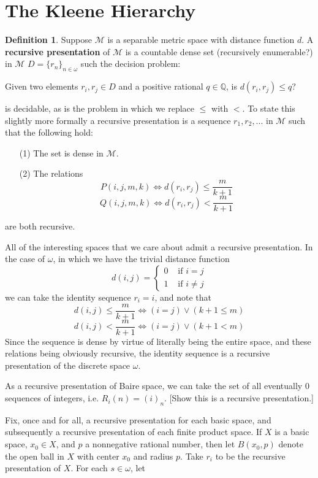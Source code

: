 \documentclass{article}
\theoremstyle{definition}
\newtheorem{definition}{Definition}[section]
\theoremstyle{plain}
\begin{document}
\section{The Kleene Hierarchy}
\begin{definition}
    Suppose $\mathcal{M}$ is a separable metric space with distance function $d$. A \textbf{recursive presentation} of $\mathcal{M}$ is a countable dense set (recursively enumerable?) in $\mathcal{M}$ $D = \{r_n\}_{n \in \omega}$ such the decision problem:
    \begin{center}
        Given two elements $r_i,r_j \in D$ and a positive rational $q \in \mathbb{Q}$, is $d(r_i,r_j) \leq q$?
    \end{center}
    is decidable, as is the problem in which we replace $\leq$ with $<$. To state this slightly more formally a recursive presentation is a sequence $r_1,r_2,...$ in $\mathcal{M}$ such that the following hold:
    \begin{itemize}
        \item[(1)] The set is dense in $\mathcal{M}$.
        \item[(2)] The relations 
        \[ P(i,j,m,k) \iff d(r_i,r_j) \leq \frac{m}{k+1} \]
        \[ Q(i,j,m,k) \iff d(r_i,r_j) < \frac{m}{k+1} \]
    \end{itemize}
    are both recursive. 
\end{definition}
All of the interesting spaces that we care about admit a recursive presentation. In the case of $\omega$, in which we have the trivial distance function 
\[ d(i,j) = \begin{cases}
                0 & \textrm{ if $i=j$} \\
                1 & \textrm{ if $i \neq j$}
            \end{cases}\]
we can take the identity sequence $r_i = i$, and note that 
\[ d(i,j) \leq \frac{m}{k+1} \iff (i=j)\vee(k+1 \leq m) \]
\[ d(i,j) < \frac{m}{k+1} \iff (i=j) \vee (k+1 < m) \]
Since the sequence is dense by virtue of literally being the entire space, and these relations being obviously recursive, the identity sequence is a recursive presentation of the discrete space $\omega$.
\par As a recursive presentation of Baire space, we can take the set of all eventually $0$ sequences of integers, i.e. $R_i(n) = (i)_n$. [Show this is a recursive presentation.]
\par [do the rest of them]
\par Fix, once and for all, a recursive presentation for each basic space, and subsequently a recursive presentation of each finite product space. If $X$ is a basic space, $x_0 \in X$, and $p$ a nonnegative rational number, then let $B(x_0,p)$ denote the open ball in $X$ with center $x_0$ and radius $p$. Take $r_i$ to be the recursive presentation of $X$. For each $s \in \omega$, let 
\end{document}
